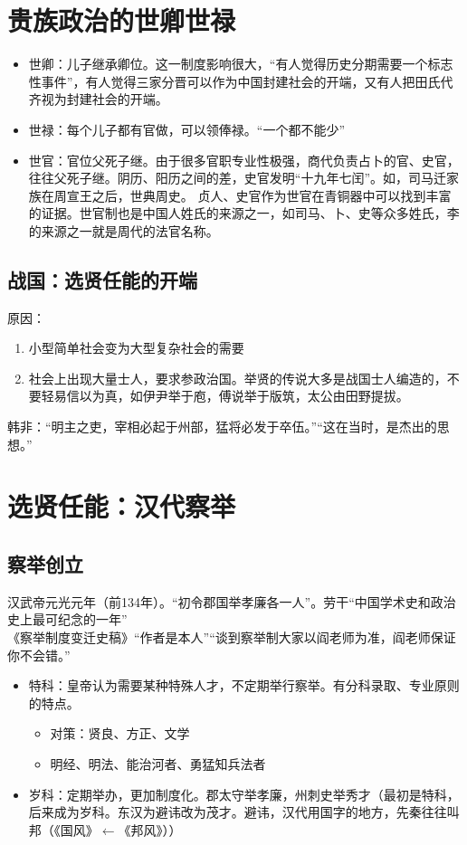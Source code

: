 \documentclass[twoside]{article}
\begin{document}
\section{贵族政治的世卿世禄}
\begin{itemize}
	\item 世卿：儿子继承卿位。这一制度影响很大，``有人觉得历史分期需要一个标志性事件''，有人觉得三家分晋可以作为中国封建社会的开端，又有人把田氏代齐视为封建社会的开端。
	\item 世禄：每个儿子都有官做，可以领俸禄。``一个都不能少''
	\item 世官：官位父死子继。由于很多官职专业性极强，商代负责占卜的官、史官，往往父死子继。阴历、阳历之间的差，史官发明``十九年七闰''。如，司马迁家族在周宣王之后，世典周史。
	贞人、史官作为世官在青铜器中可以找到丰富的证据。世官制也是中国人姓氏的来源之一，如司马、卜、史等众多姓氏，李的来源之一就是周代的法官名称。
\end{itemize}
\subsection{战国：选贤任能的开端}
原因：
\begin{enumerate}
	\item 小型简单社会变为大型复杂社会的需要
	\item 社会上出现大量士人，要求参政治国。举贤的传说大多是战国士人编造的，不要轻易信以为真，如伊尹举于庖，傅说举于版筑，太公由田野提拔。
\end{enumerate}
韩非：``明主之吏，宰相必起于州部，猛将必发于卒伍。''``这在当时，是杰出的思想。''

\section{选贤任能：汉代察举}
\subsection{察举创立}
汉武帝元光元年（前134年）。``初令郡国举孝廉各一人''。劳干``中国学术史和政治史上最可纪念的一年''\\
《察举制度变迁史稿》``作者是本人''``谈到察举制大家以阎老师为准，阎老师保证你不会错。''\\
\begin{itemize}
	\item 特科：皇帝认为需要某种特殊人才，不定期举行察举。有分科录取、专业原则的特点。
		\begin{itemize}
			\item 对策：贤良、方正、文学
			\item 明经、明法、能治河者、勇猛知兵法者
		\end{itemize}
	\item 岁科：定期举办，更加制度化。郡太守举孝廉，州刺史举秀才（最初是特科，后来成为岁科。东汉为避讳改为茂才。避讳，汉代用国字的地方，先秦往往叫邦（《国风》$\leftarrow$《邦风》））
\end{itemize}
\end{document}
